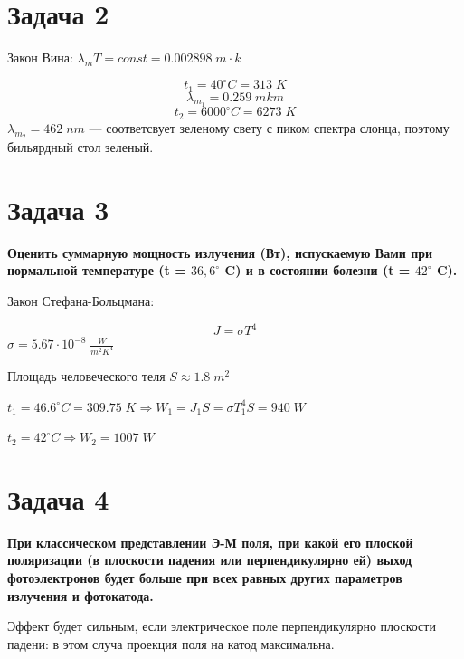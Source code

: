 \documentclass[14pt,a4paper]{article}
\begin{document}
\section*{Задача 2}
    
    Закон Вина: $\lambda_m T = const = 0.002898 \; m\cdot k$

    $$t_1 = 40 ^{\circ} C = 313\; K$$
    $$ \lambda_{m_1} = 0.259 \; mkm $$
    $$ t_2 = 6000 ^{\circ} C = 6273\; K $$
    $ \lambda_{m_2} = 462\; nm $ — соответсвует зеленому свету с пиком спектра слонца, поэтому бильярдный стол зеленый.
  
\vspace{1cm}

\section*{Задача 3}
    
    \par \textbf{Оценить суммарную мощность излучения (Вт), испускаемую Вами при нормальной температуре (t = $36,6^{\circ}$ C) и в состоянии болезни (t = $42^{\circ}$ C).}\\

    \par

    Закон Стефана-Больцмана:

    $$ J = \sigma T^4 $$
    $\sigma = 5.67\cdot 10^{-8} \; \frac{W}{m^2 K^4}$

    Площадь человеческого теля $S \approx 1.8\; m^2$

    $t_1 = 46.6 ^{\circ} C = 309.75\; K \Rightarrow W_1 = J_1 S = \sigma T_1^4S = 940\; W$
    \par 
    $ t_2 = 42 ^{\circ} C \Rightarrow W_2 = 1007\; W $
    
\section*{Задача 4}
    
    \par \textbf{При классическом представлении Э-М поля, при какой его плоской поляризации (в плоскости падения или перпендикулярно ей) выход фотоэлектронов будет больше при всех равных других параметров излучения и фотокатода.}\\
    
    \par

    Эффект будет сильным, если электрическое поле перпендикулярно плоскости падени: в этом случа проекция поля на катод максимальна.
    
\end{document}
